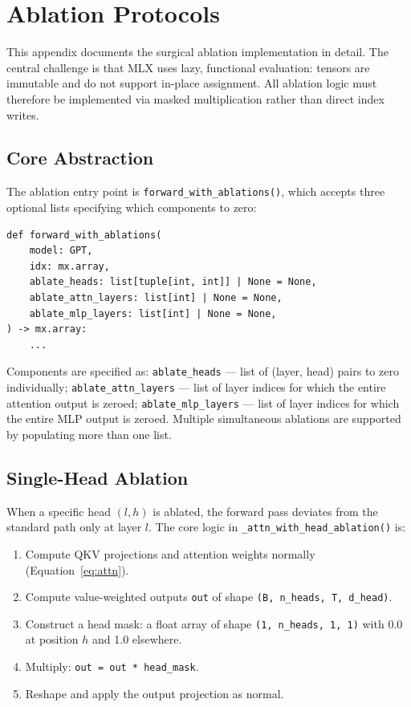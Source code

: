 \clearpage

\section{Ablation Protocols}
\label{app:ablation_protocols}

This appendix documents the surgical ablation implementation in detail.
The central challenge is that MLX uses lazy, functional evaluation: tensors are immutable
and do not support in-place assignment. All ablation logic must therefore be implemented
via masked multiplication rather than direct index writes.

\subsection{Core Abstraction}

The ablation entry point is \texttt{forward\_with\_ablations()}, which accepts three optional
lists specifying which components to zero:

\begin{verbatim}
def forward_with_ablations(
    model: GPT,
    idx: mx.array,
    ablate_heads: list[tuple[int, int]] | None = None,
    ablate_attn_layers: list[int] | None = None,
    ablate_mlp_layers: list[int] | None = None,
) -> mx.array:
    ...
\end{verbatim}

Components are specified as: \texttt{ablate\_heads} --- list of (layer, head) pairs to zero
individually; \texttt{ablate\_attn\_layers} --- list of layer indices for which the entire
attention output is zeroed; \texttt{ablate\_mlp\_layers} --- list of layer indices for which
the entire MLP output is zeroed. Multiple simultaneous ablations are supported by populating
more than one list.

\subsection{Single-Head Ablation}

When a specific head $(l, h)$ is ablated, the forward pass deviates from the standard path
only at layer $l$. The core logic in \texttt{\_attn\_with\_head\_ablation()} is:

\begin{enumerate}
    \item Compute QKV projections and attention weights normally (Equation~\ref{eq:attn}).
    \item Compute value-weighted outputs \texttt{out} of shape \texttt{(B, n\_heads, T, d\_head)}.
    \item Construct a head mask: a float array of shape \texttt{(1, n\_heads, 1, 1)} with 0.0
          at position $h$ and 1.0 elsewhere.
    \item Multiply: \texttt{out = out * head\_mask}.
    \item Reshape and apply the output projection as normal.
\end{enumerate}

